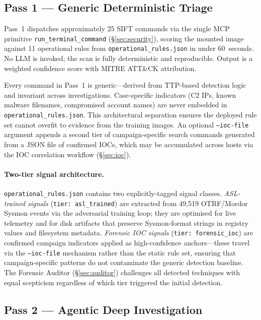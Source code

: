 \documentclass[sigconf, nonacm]{acmart}
\begin{document}
\subsection{Pass 1 — Generic Deterministic Triage}

Pass~1 dispatches approximately 25 SIFT commands via the single MCP
primitive \texttt{run\_terminal\_command} (§\ref{sec:security}), scoring
the mounted image against 11 operational rules from
\texttt{operational\_rules.json} in under 60~seconds.
No LLM is invoked; the scan is fully deterministic and reproducible.
Output is a weighted confidence score with MITRE ATT\&CK attribution.

Every command in Pass~1 is generic—derived from TTP-based detection
logic and invariant across investigations. Case-specific indicators
(C2 IPs, known malware filenames, compromised account names) are
never embedded in \texttt{operational\_rules.json}. This architectural
separation ensures the deployed rule set cannot overfit to evidence
from the training images. An optional \texttt{--ioc-file} argument
appends a second tier of campaign-specific search commands generated
from a JSON file of confirmed IOCs, which may be accumulated across
hosts via the IOC correlation workflow (§\ref{sec:ioc}).

\paragraph{Two-tier signal architecture.}
\texttt{operational\_rules.json} contains two explicitly-tagged signal
classes.  \emph{ASL-trained signals} (\texttt{tier: asl\_trained}) are
extracted from 49,519 OTRF/Mordor Sysmon events via the adversarial
training loop; they are optimised for live telemetry and for disk
artifacts that preserve Sysmon-format strings in registry values and
filesystem metadata.  \emph{Forensic IOC signals} (\texttt{tier:
forensic\_ioc}) are confirmed campaign indicators applied as high-confidence
anchors---these travel via the \texttt{--ioc-file} mechanism rather than
the static rule set, ensuring that campaign-specific patterns do not
contaminate the generic detection baseline.  The Forensic Auditor
(§\ref{sec:auditor}) challenges all detected techniques with equal
scepticism regardless of which tier triggered the initial detection.

\subsection{Pass 2 — Agentic Deep Investigation}
\end{document}
